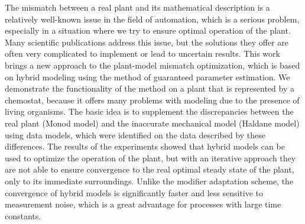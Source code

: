 
The mismatch between a real plant and its mathematical description is a relatively well-known issue in the field of automation,
which is a serious problem, especially in a situation where we try to ensure optimal operation of the plant. Many scientific publications address this issue, but the solutions they offer are often very complicated to implement or lead to uncertain results. 
This work brings a new approach to the plant-model mismatch optimization, which is based on hybrid modeling using the method of guaranteed parameter estimation. We demonstrate the functionality of the method on a plant that is represented by a chemostat, because it
offers many problems with modeling due to the presence of living organisms. The basic idea is to supplement the discrepancies between the real plant (Monod model) and the inaccurate mechanical model (Haldane model) using data models, which were identified on the data described by these differences.
The results of the experiments showed that hybrid models can be used to optimize the operation of the plant, but  with an iterative approach they are not able to ensure convergence to the real optimal steady state of the plant, only to its immediate surroundings. Unlike the modifier adaptation scheme, the convergence of hybrid models is significantly faster and less sensitive to measurement noise, which is a great advantage for processes with large time constants.
